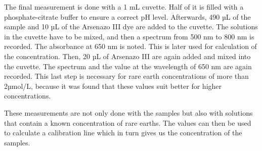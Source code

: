 The final measurement is done with a 1 mL cuvette.
Half of it is filled with a phosphate-citrate buffer to ensure a correct pH level.
Afterwards, 490 µL of the sample and 10 µL of the Arsenazo III dye are added to the cuvette.
The solutions in the cuvette have to be mixed, and then a spectrum from 500 nm to 800 nm is recorded.
The absorbance at 650 nm is noted.
This is later used for calculation of the concentration.
Then, 20 µL of Arsenazo III are again added and mixed into the cuvette.
The spectrum and the value at the wavelength of 650 nm are again recorded.
This last step is necessary for rare earth concentrations of more than 2µmol/L, because it was found that these values suit better for higher concentrations.

These measurements are not only done with the samples but also with solutions that contain a known concentration of rare earths.
The values can then be used to calculate a calibration line which in turn gives us the concentration of the samples.
